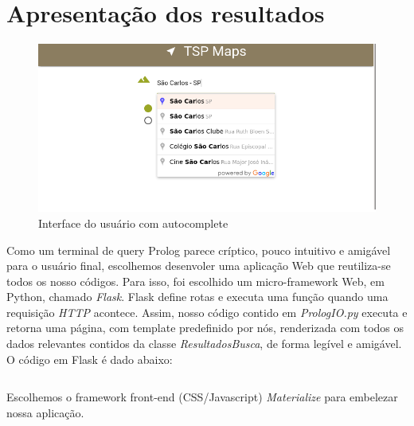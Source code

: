\documentclass[12pt,a4paper]{article}
\begin{document}
  \section{Apresentação dos resultados}
\begin{figure}[H]
  \centering
  \includegraphics[width=0.8\linewidth]{tela1.png}
  \caption{Interface do usuário com autocomplete}
  \label{fig:tela1}
\end{figure}
  Como um terminal de query Prolog parece críptico, pouco intuitivo e amigável para o usuário final, escolhemos desenvoler uma aplicação Web que reutiliza-se todos os nosso códigos. Para isso, foi escolhido um micro-framework Web, em Python, chamado \emph{Flask}. Flask define rotas e executa uma função quando uma requisição \emph{HTTP} acontece. Assim, nosso código contido em \emph{PrologIO.py} executa e retorna uma página, com template predefinido por nós, renderizada com todos os dados relevantes contidos da classe \emph{ResultadosBusca}, de forma legível e amigável. O código em Flask é dado abaixo:
  \begin{mdframed}[linecolor=black, topline=true, bottomline=true,leftline=false, rightline=false, backgroundcolor=yellow!10!white]
\inputminted[tabsize=2,linenos=true,fontsize=\footnotesize,breaklines=true,breakafter=format]{python}{../tspserver.py}
\end{mdframed}

Escolhemos o framework front-end (CSS/Javascript) \emph{Materialize} para embelezar nossa aplicação.
\end{document}
